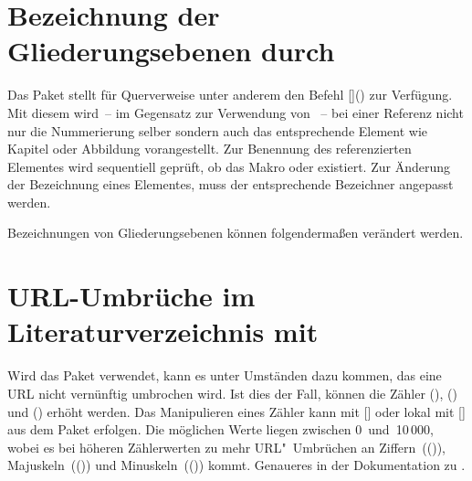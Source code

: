 \section{%
  Bezeichnung der Gliederungsebenen durch %
  \label{sec:tips:references}%
}

%
Das Paket  stellt für Querverweise unter anderem den Befehl 
[]() zur Verfügung. Mit diesem 
wird~-- im Gegensatz zur Verwendung von ~-- bei einer Referenz nicht 
nur die Nummerierung selber sondern auch das entsprechende Element wie Kapitel 
oder Abbildung vorangestellt. Zur Benennung des referenzierten Elementes wird 
sequentiell geprüft, ob das Makro  oder 
 existiert. Zur Änderung der Bezeichnung eines 
Elementes, muss der entsprechende Bezeichner angepasst werden.
%
\begin{Example}
Bezeichnungen von Gliederungsebenen können folgendermaßen verändert werden.
\begin{Code}
\end{Code}
\end{Example}



\section{%
  URL-Umbrüche im Literaturverzeichnis mit %
}

%
Wird das Paket  verwendet, kann es unter Umständen dazu 
kommen, das eine URL nicht vernünftig umbrochen wird. Ist dies der Fall, 
können die Zähler (), 
() und 
() erhöht werden. Das Manipulieren 
eines Zähler kann mit [] oder lokal mit 
[] aus dem Paket  erfolgen. 
Die möglichen Werte liegen zwischen 0~und~10\,000, wobei es bei höheren 
Zählerwerten zu mehr URL"~Umbrüchen an 
Ziffern~(()), 
Majuskeln~(()) und 
Minuskeln~(()) kommt. 
Genaueres in der Dokumentation zu .



